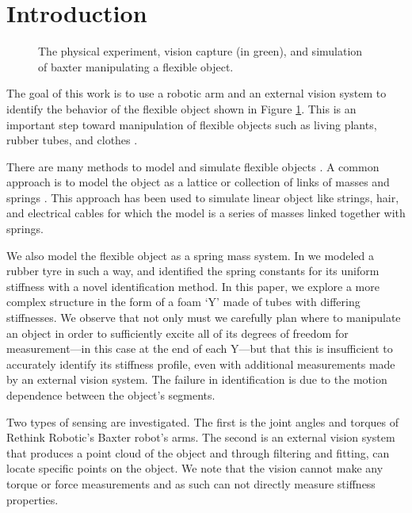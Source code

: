 \documentclass[runningheads,a4paper]{llncs}
\begin{document}
\section{Introduction}

\begin{figure}[!htb]
\centering
\def\svgwidth{.95\textwidth}%

\caption{The physical experiment, vision capture (in green), and simulation of baxter manipulating a flexible object.} %
\label{fig-baxter_y}
\end{figure}

The goal of this work is to use a robotic arm and an external vision system to identify the behavior of the flexible object shown in Figure \ref{fig-baxter_y}. This is an important step toward manipulation of flexible objects such as living plants, rubber tubes, and clothes \cite{wakamatsu2006knotting,saha2007manipulation,bell2010flexible,jimenez2012survey}.  

There are many methods to model and simulate flexible objects \cite{khalil_payeur,lang_etal}.  A common approach is to model the object as a lattice or collection of links of masses and springs \cite{sahari_etal,wakamatsu_etal,khalil_payeur}.  This approach has been used to simulate linear object like strings, hair, and electrical cables for which the model is a series of masses linked together with springs. %

We also model the flexible object as a spring mass system.  In \cite{caldwell_coleman_correll_iros} we modeled a rubber tyre in such a way, and identified the spring constants for its uniform stiffness with a novel identification method. In this paper, we explore a more complex structure in the form of a foam `Y' made of tubes with differing stiffnesses. We observe that not only must we carefully plan where to manipulate an object in order to sufficiently excite all of its degrees of freedom for measurement---in this case at the end of each Y---but that this is insufficient to accurately identify its stiffness profile, even with additional measurements made by an external vision system. The failure in identification is due to the motion dependence between the object's segments.

Two types of sensing are investigated. The first is the joint angles and torques of Rethink Robotic's Baxter robot's arms. The second is an external vision system that produces a point cloud of the object and through filtering and fitting, can locate specific points on the object. We note that the vision cannot make any torque or force measurements and as such can not directly measure stiffness properties.
\end{document}
